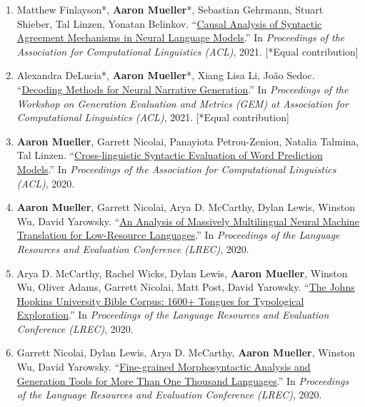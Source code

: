\documentclass[10pt]{article}
\providecommand*\titlelink[2]{\href{#1}{\textcolor{accent}{#2}}}
\begin{document}
\begin{enumerate}[leftmargin=*, topsep=0pt, itemsep=0.25ex, partopsep=0ex, parsep=1ex]
	\item Matthew Finlayson*, \textbf{Aaron Mueller}*, Sebastian Gehrmann, Stuart Shieber, Tal Linzen, Yonatan Belinkov. ``\titlelink{https://aclanthology.org/2021.acl-long.144/}{Causal Analysis of Syntactic Agreement Mechanisms in Neural Language Models}.'' In \emph{Proceedings of the Association for Computational Linguistics (ACL)}, 2021. [*Equal contribution]\label{pub:causal}
	
	\item Alexandra DeLucia*, \textbf{Aaron Mueller}*, Xiang Lisa Li, João Sedoc. ``\titlelink{https://aclanthology.org/2021.gem-1.16/}{Decoding Methods for Neural Narrative Generation}.'' In \emph{Proceedings of the Workshop on Generation Evaluation and Metrics (GEM) at Association for Computational Linguistics (ACL)}, 2021. [*Equal contribution]

	\item \textbf{Aaron Mueller}, Garrett Nicolai, Panayiota Petrou-Zeniou, Natalia Talmina, Tal Linzen. ``\titlelink{https://aclanthology.org/2020.acl-main.490/}{Cross-linguistic Syntactic Evaluation of Word Prediction Models}.'' In \emph{Proceedings of the Association for Computational Linguistics (ACL)}, 2020.

	\item \textbf{Aaron Mueller}, Garrett Nicolai, Arya D. McCarthy, Dylan Lewis, Winston Wu, David Yarowsky. ``\titlelink{https://aclanthology.org/2020.lrec-1.458/}{An Analysis of Massively Multilingual Neural Machine Translation for Low-Resource Languages}.'' In \emph{Proceedings of the Language Resources and Evaluation Conference (LREC)}, 2020.

	\item Arya D. McCarthy, Rachel Wicks, Dylan Lewis, \textbf{Aaron Mueller}, Winston Wu, Oliver Adams, Garrett Nicolai, Matt Post, David Yarowsky. ``\titlelink{https://aclanthology.org/2020.lrec-1.352/}{The Johns Hopkins University Bible Corpus: 1600+ Tongues for Typological Exploration}.'' In \emph{Proceedings of the Language Resources and Evaluation Conference (LREC)}, 2020.

	\item Garrett Nicolai, Dylan Lewis, Arya D. McCarthy, \textbf{Aaron Mueller}, Winston Wu, David Yarowsky. ``\titlelink{https://aclanthology.org/2020.lrec-1.488/}{Fine-grained Morphosyntactic Analysis and Generation Tools for More Than One Thousand Languages}.'' In \emph{Proceedings of the Language Resources and Evaluation Conference (LREC)}, 2020.


\end{enumerate}
\end{document}
